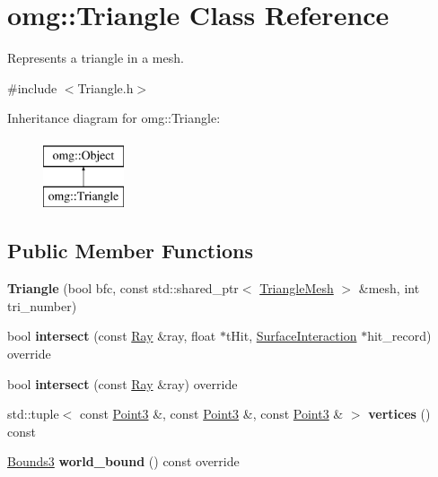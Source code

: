 \hypertarget{classomg_1_1_triangle}{}\section{omg\+::Triangle Class Reference}
\label{classomg_1_1_triangle}


Represents a triangle in a mesh.  




{\ttfamily \#include $<$Triangle.\+h$>$}

Inheritance diagram for omg\+::Triangle\+:\begin{figure}[H]
\begin{center}
\leavevmode
\includegraphics[height=2.000000cm]{classomg_1_1_triangle}
\end{center}
\end{figure}
\subsection*{Public Member Functions}
\begin{DoxyCompactItemize}
\item 
\mbox{\label{classomg_1_1_triangle_a64dc77293b948694a2004381dd085fbc}} 
{\bfseries Triangle} (bool bfc, const std\+::shared\+\_\+ptr$<$ \mbox{\hyperlink{structomg_1_1_triangle_mesh}{Triangle\+Mesh}} $>$ \&mesh, int tri\+\_\+number)
\item 
\mbox{\label{classomg_1_1_triangle_ad22556418d61acfe7aa67d3bb0a5cb40}} 
bool {\bfseries intersect} (const \mbox{\hyperlink{classomg_1_1_ray}{Ray}} \&ray, float $\ast$t\+Hit, \mbox{\hyperlink{classomg_1_1_surface_interaction}{Surface\+Interaction}} $\ast$hit\+\_\+record) override
\item 
\mbox{\label{classomg_1_1_triangle_a4f269b31b840a553da91c5085fd10542}} 
bool {\bfseries intersect} (const \mbox{\hyperlink{classomg_1_1_ray}{Ray}} \&ray) override
\item 
\mbox{\label{classomg_1_1_triangle_aff6ada0dec320d892e906860fcc02409}} 
std\+::tuple$<$ const \mbox{\hyperlink{namespaceomg_af85242d35fdacf829d32a6f9b95f3e35}{Point3}} \&, const \mbox{\hyperlink{namespaceomg_af85242d35fdacf829d32a6f9b95f3e35}{Point3}} \&, const \mbox{\hyperlink{namespaceomg_af85242d35fdacf829d32a6f9b95f3e35}{Point3}} \& $>$ {\bfseries vertices} () const
\item 
\mbox{\label{classomg_1_1_triangle_a4fcdf7ff7dfca3b2f03c8585fc14ebad}} 
\mbox{\hyperlink{classomg_1_1_bounds3}{Bounds3}} {\bfseries world\+\_\+bound} () const override
\end{DoxyCompactItemize}
